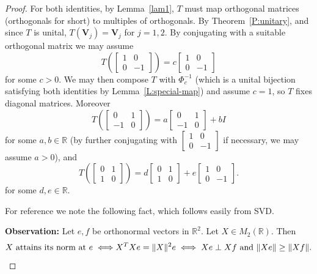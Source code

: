 \documentclass[11pt]{article}
\numberwithin{equation}{section}
\def\IR{{\mathbb R}}
\def\bV{{\mathbf V}}
\def\bV{{\mathbf V}}
\begin{document}
\begin{proof}
	For both identities, by Lemma~\ref{lam1}, $T$ must map orthogonal  matrices (orthogonals for short) to multiples of orthogonals.  By
	Theorem~\ref{P:unitary}, and since $T$ is unital, $T(\bV_j) = \bV_j$ for $j=1,2$.
	By conjugating with a suitable orthogonal matrix we may assume
	$$T \left(\begin{bmatrix} 1 & 0 \\ 0 & -1 \end{bmatrix} \right) = c\begin{bmatrix} 1 & 0 \\ 0 & -1 \end{bmatrix}$$
	for some $c > 0$.  We may then compose $T$ with $\Phi_c^{-1}$ (which is a unital bijection satisfying both identities by Lemma~\ref{L:special-map}) and assume $c=1$, so $T$ fixes diagonal matrices.
	Moreover
	$$T \left(\begin{bmatrix} 0 & 1 \\ -1 & 0  \end{bmatrix} \right) = a \begin{bmatrix} 0 & 1 \\ -1 & 0  \end{bmatrix} + bI$$
	for some $a,b \in \IR$ (by further conjugating with $\left[ \begin{smallmatrix} 1 & 0 \\ 0 & -1 \end{smallmatrix} \right]$ if necessary, we may assume $a>0$),
	 	and
	$$T \left(\begin{bmatrix} 0 & 1 \\ 1 & 0  \end{bmatrix} \right) = d \begin{bmatrix} 0 & 1 \\ 1 & 0  \end{bmatrix} + e \begin{bmatrix} 1 & 0 \\ 0 & -1 \end{bmatrix}.$$
	for some $d,e \in \IR$.
	\bigskip

	For reference we note the following fact, which follows easily from SVD.

	\textbf{Observation:} Let $e,f$ be orthonormal vectors in $\IR^2$.  Let $X \in M_2(\IR)$.  Then
	\begin{equation}\label{E:NA}
		X \text{ attains its norm at } e \iff \\ X^TXe = \|X\|^2 e \iff Xe \perp Xf \text{ and } \|Xe\| \geq \|Xf\|.
	\end{equation}



\end{proof}
\end{document}

